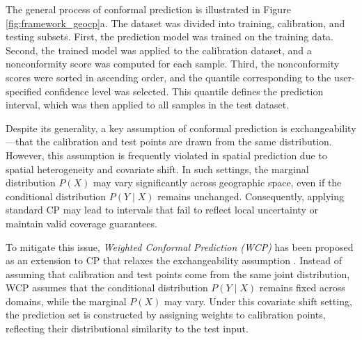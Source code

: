 \documentclass[authoryear,preprint,review,12pt]{elsarticle}
\begin{document}
The general process of conformal prediction is illustrated in Figure \ref{fig:framework_geocp}a. The dataset was divided into training, calibration, and testing subsets. First, the prediction model was trained on the training data. Second, the trained model was applied to the calibration dataset, and a nonconformity score was computed for each sample. Third, the nonconformity scores were sorted in ascending order, and the quantile corresponding to the user-specified confidence level was selected. This quantile defines the prediction interval, which was then applied to all samples in the test dataset.

Despite its generality, a key assumption of conformal prediction is exchangeability—that the calibration and test points are drawn from the same distribution. However, this assumption is frequently violated in spatial prediction due to spatial heterogeneity and covariate shift. In such settings, the marginal distribution $P(X)$ may vary significantly across geographic space, even if the conditional distribution $P(Y \mid X)$ remains unchanged. Consequently, applying standard CP may lead to intervals that fail to reflect local uncertainty or maintain valid coverage guarantees.

To mitigate this issue, \textit{Weighted Conformal Prediction (WCP)} has been proposed as an extension to CP that relaxes the exchangeability assumption \citep{tibshirani2019conformal}. Instead of assuming that calibration and test points come from the same joint distribution, WCP assumes that the conditional distribution $P(Y \mid X)$ remains fixed across domains, while the marginal $P(X)$ may vary. Under this covariate shift setting, the prediction set is constructed by assigning weights to calibration points, reflecting their distributional similarity to the test input.
\end{document}
